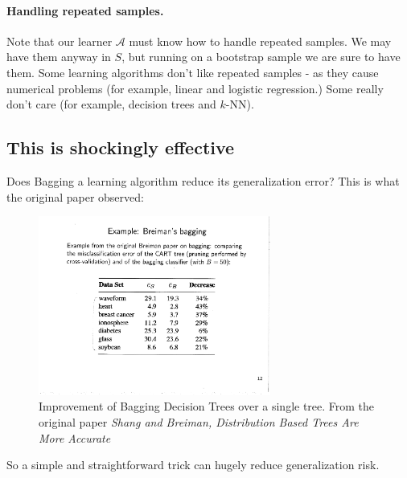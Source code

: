 \documentclass[11pt]{article}
\newcommand{\Ac}{\mathcal{A}}
\begin{document}
\paragraph{Handling repeated samples.} 
Note that our learner $\Ac$ must know how to handle repeated samples. We may have them
anyway in $S$, but running on a bootstrap sample we are sure to have them. Some
learning algorithms don't like repeated samples - as they cause numerical
problems (for example, linear and logistic regression.) Some really don't care
(for example, decision trees and $k$-NN).


\subsection{This is shockingly effective}

Does Bagging a learning algorithm reduce its generalization error? This is what
the original paper observed:
\begin{figure}[H]
  \centering
  \includegraphics[width=3in]{breiman.pdf}
  \caption{Improvement of Bagging Decision Trees over a single tree. From the
    original paper \emph{
  Shang and Breiman,  Distribution Based Trees Are More Accurate}}
  \label{breiman}
\end{figure}

\noindent So a simple and straightforward trick can hugely reduce generalization risk.
\end{document}
